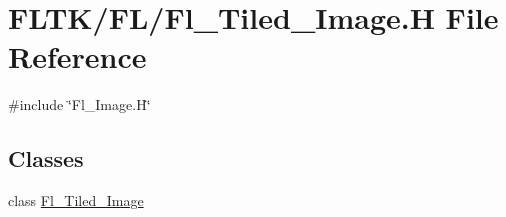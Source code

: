 \hypertarget{_fl___tiled___image_8_h}{}\section{F\+L\+T\+K/\+F\+L/\+Fl\+\_\+\+Tiled\+\_\+\+Image.H File Reference}
\label{_fl___tiled___image_8_h}
{\ttfamily \#include \char`\"{}Fl\+\_\+\+Image.\+H\char`\"{}}\newline
\subsection*{Classes}
\begin{DoxyCompactItemize}
\item 
class \hyperlink{class_fl___tiled___image}{Fl\+\_\+\+Tiled\+\_\+\+Image}
\end{DoxyCompactItemize}

